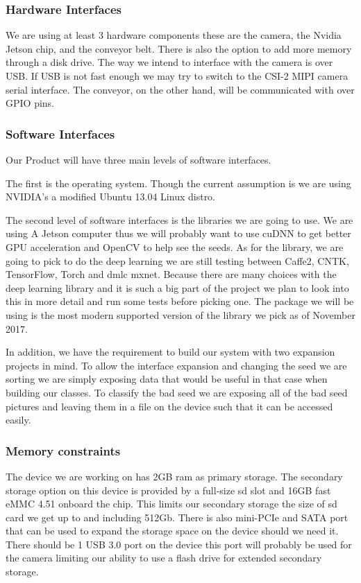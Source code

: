 \documentclass[onecolumn, draftclsnofoot,10pt, compsoc]{IEEEtran}
\begin{document}
\subsubsection{Hardware Interfaces}
We are using at least 3 hardware components these are the camera, the Nvidia Jetson chip, and the conveyor belt.
There is also the option to add more memory through a disk drive.
The way we intend to interface with the camera is over USB.
If USB is not fast enough we may try to switch to the CSI-2 MIPI camera serial interface.
The conveyor, on the other hand, will be communicated with over GPIO pins.

\subsubsection{Software Interfaces}
Our Product will have three main levels of software interfaces.

The first is the operating system.
Though the current assumption is we are using NVIDIA's a modified Ubuntu 13.04 Linux distro.

The second level of software interfaces is the libraries we are going to use.
We are using A Jetson computer thus we will probably want to use cuDNN to get better GPU acceleration and OpenCV to help see the seeds.
As for the library, we are going to pick to do the deep learning we are still testing between Caffe2, CNTK, TensorFlow, Torch and dmlc mxnet.
Because there are many choices with the deep learning library and it is such a big part of the project we plan to look into this in more detail and run some tests before picking one.
The package we will be using is the most modern supported version of the library we pick as of November 2017.

In addition, we have the requirement to build our system with two expansion projects in mind.
To allow the interface expansion and changing the seed we are sorting we are simply exposing data that would be useful in that case when building our classes.
To classify the bad seed we are exposing all of the bad seed pictures and leaving them in a file on the device such that it can be accessed easily.

\subsubsection{Memory constraints}
The device we are working on has 2GB ram as primary storage.
The secondary storage option on this device is provided by a full-size sd slot and 16GB fast eMMC 4.51 onboard the chip.
This limits our secondary storage the size of sd card we get up to and including 512Gb.
There is also mini-PCIe and SATA port that can be used to expand the storage space on the device should we need it.
There should be 1 USB 3.0 port on the device this port will probably be used for the camera limiting our ability to use a flash drive for extended secondary storage.
\end{document}
